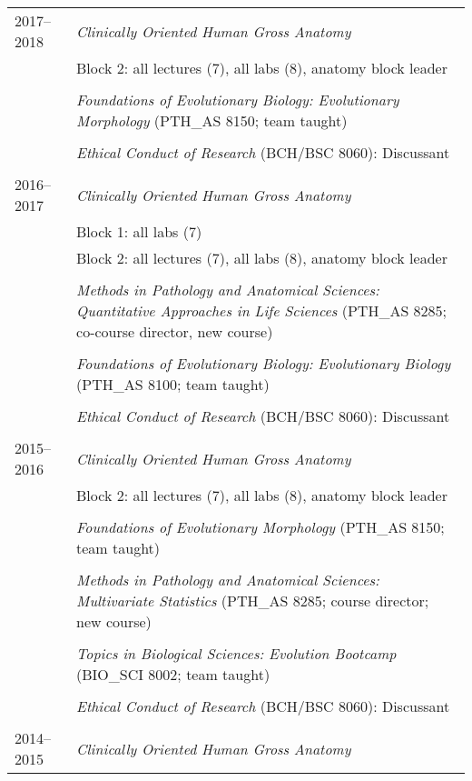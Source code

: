 \begin{longtable}{@{}lX@{}}
  2017--2018 & \textit{Clinically Oriented Human Gross Anatomy}\\
    & Block 2: all lectures (7), all labs (8), anatomy block leader\\
    \\
    & \textit{Foundations of Evolutionary Biology: Evolutionary Morphology} (PTH\_AS 8150; team taught)\\
    \\
    & \textit{Ethical Conduct of Research} (BCH/BSC 8060): Discussant\\
    \\
    2016--2017 & \textit{Clinically Oriented Human Gross Anatomy}\\
    & Block 1: all labs (7)\\
    & Block 2: all lectures (7), all labs (8), anatomy block leader\\
    \\
    & \textit{Methods in Pathology and Anatomical Sciences: Quantitative Approaches in Life Sciences} (PTH\_AS 8285; co-course director, new course)\\
    \\
    & \textit{Foundations of Evolutionary Biology: Evolutionary Biology} (PTH\_AS 8100; team taught)\\
    \\
    & \textit{Ethical Conduct of Research} (BCH/BSC 8060): Discussant\\
    \\
  2015--2016 & \textit{Clinically Oriented Human Gross Anatomy}\\
    & Block 2: all lectures (7), all labs (8), anatomy block leader\\
    \\
    & \textit{Foundations of Evolutionary Morphology} (PTH\_AS 8150; team taught)\\
    \\
    & \textit{Methods in Pathology and Anatomical Sciences: Multivariate Statistics} (PTH\_AS 8285; course director; new course)\\
    \\
    & \textit{Topics in Biological Sciences: Evolution Bootcamp} (BIO\_SCI 8002; team taught)\\
    \\
    & \textit{Ethical Conduct of Research} (BCH/BSC 8060): Discussant\\
    \\
  2014--2015& \textit{Clinically Oriented Human Gross Anatomy}\\

\end{longtable}
